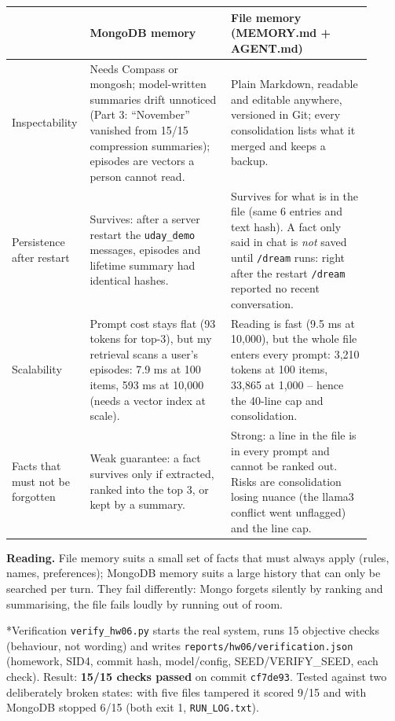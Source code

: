\documentclass[11pt]{article}
\makeatletter
\renewcommand\section{\@startsection{section}{1}{\z@}{-3.0ex \@plus -1ex \@minus -.2ex}{1.2ex \@plus.2ex}{\normalfont\fontsize{14}{17}\selectfont\bfseries}}
\makeatother
\begin{document}
\begin{center}
\small\setlength{\tabcolsep}{4pt}
\begin{tabular}{p{0.15\linewidth}p{0.38\linewidth}p{0.38\linewidth}}
\toprule
\textbf{} & \textbf{MongoDB memory} & \textbf{File memory (MEMORY.md + AGENT.md)} \\
\midrule
Inspectability & Needs Compass or mongosh; model-written summaries drift unnoticed (Part 3: ``November'' vanished from 15/15 compression summaries); episodes are vectors a person cannot read. & Plain Markdown, readable and editable anywhere, versioned in Git; every consolidation lists what it merged and keeps a backup. \\
Persistence after restart & Survives: after a server restart the \texttt{uday\_demo} messages, episodes and lifetime summary had identical hashes. & Survives for what is in the file (same 6 entries and text hash). A fact only said in chat is \emph{not} saved until \texttt{/dream} runs: right after the restart \texttt{/dream} reported no recent conversation. \\
Scalability & Prompt cost stays flat (93 tokens for top-3), but my retrieval scans a user's episodes: 7.9 ms at 100 items, 593 ms at 10,000 (needs a vector index at scale). & Reading is fast (9.5 ms at 10,000), but the whole file enters every prompt: 3,210 tokens at 100 items, 33,865 at 1,000 -- hence the 40-line cap and consolidation. \\
Facts that must not be forgotten & Weak guarantee: a fact survives only if extracted, ranked into the top 3, or kept by a summary. & Strong: a line in the file is in every prompt and cannot be ranked out. Risks are consolidation losing nuance (the llama3 conflict went unflagged) and the line cap. \\
\bottomrule
\end{tabular}
\end{center}
\textbf{Reading.} File memory suits a small set of facts that must always apply (rules, names, preferences); MongoDB memory suits a large history that can only be searched per turn. They fail differently: Mongo forgets silently by ranking and summarising, the file fails loudly by running out of room.

\section*{Verification}
\verb|verify_hw06.py| starts the real system, runs 15 objective checks (behaviour, not wording) and writes \verb|reports/hw06/verification.json| (homework, SID4, commit hash, model/config, SEED/VERIFY\_SEED, each check). Result: \textbf{15/15 checks passed} on commit \texttt{cf7de93}. Tested against two deliberately broken states: with five files tampered it scored 9/15 and with MongoDB stopped 6/15 (both exit 1, \verb|RUN_LOG.txt|).
\end{document}
